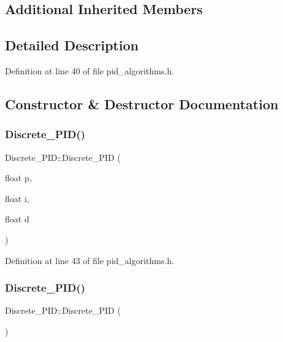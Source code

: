 \subsection*{Additional Inherited Members}


\subsection{Detailed Description}


Definition at line 40 of file pid\+\_\+algorithms.\+h.



\subsection{Constructor \& Destructor Documentation}
\mbox{\label{class_discrete___p_i_d_a85706a0b048068792beef25ad1972c3e}} 
\subsubsection{\texorpdfstring{Discrete\_PID()}{Discrete\_PID()}\hspace{0.1cm}{\footnotesize\ttfamily [1/4]}}
{\footnotesize\ttfamily Discrete\+\_\+\+P\+I\+D\+::\+Discrete\+\_\+\+P\+ID (\begin{DoxyParamCaption}\item[{float}]{p,  }\item[{float}]{i,  }\item[{float}]{d }\end{DoxyParamCaption})\hspace{0.3cm}{\ttfamily [inline]}}



Definition at line 43 of file pid\+\_\+algorithms.\+h.

\mbox{\label{class_discrete___p_i_d_a15ef57a76593edd62150e0eafe5211d8}} 
\subsubsection{\texorpdfstring{Discrete\_PID()}{Discrete\_PID()}\hspace{0.1cm}{\footnotesize\ttfamily [2/4]}}
{\footnotesize\ttfamily Discrete\+\_\+\+P\+I\+D\+::\+Discrete\+\_\+\+P\+ID (\begin{DoxyParamCaption}{ }\end{DoxyParamCaption})\hspace{0.3cm}{\ttfamily [inline]}}



